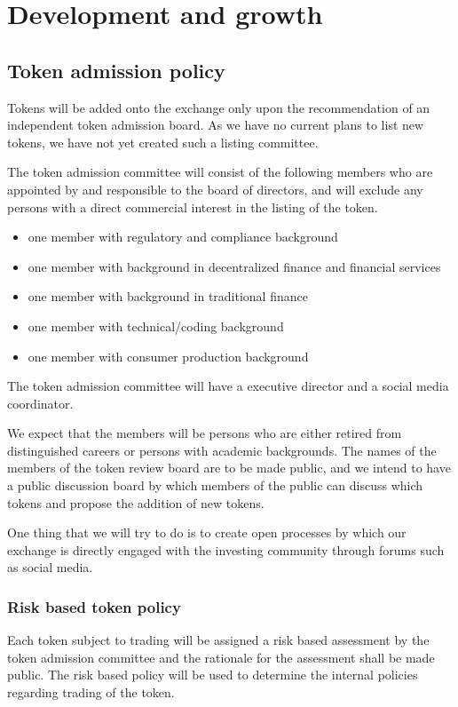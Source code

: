 \chapter{Development and growth}

\section{Token admission policy}

Tokens will be added onto the exchange only upon the recommendation of
an independent token admission board.  As we have no current plans to
list new tokens, we have not yet created such a listing committee.

The token admission committee will consist of the following members
who are appointed by and responsible to the board of directors, and
will exclude any persons with a direct commercial interest in the
listing of the token.

\begin{itemize}
  \item one member with regulatory and compliance background
  \item one member with background in decentralized finance and
    financial services
  \item one member with background in traditional finance
  \item one member with technical/coding background
  \item one member with consumer production background
\end{itemize}

The token admission committee will have a executive director and a
social media coordinator.

We expect that the members will be persons who are either retired from
distinguished careers or persons with academic backgrounds.  The names
of the members of the token review board are to be made public, and we
intend to have a public discussion board by which members of the
public can discuss which tokens and propose the addition of new
tokens.

One thing that we will try to do is to create open processes by which
our exchange is directly engaged with the investing community through
forums such as social media.

\subsection{Risk based token policy}
Each token subject to trading will be assigned a risk based assessment
by the token admission committee and the rationale for the assessment
shall be made public.  The risk based policy will be used to determine
the internal policies regarding trading of the token.


